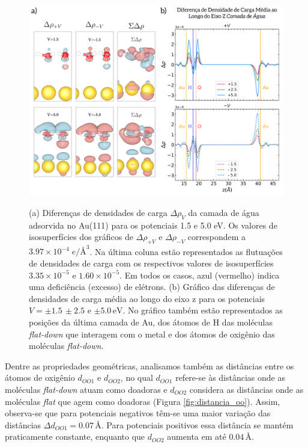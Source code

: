 \begin{figure}[t!]
	\centering
	\caption{(a) Diferenças de densidades de carga $ \Delta \rho_{V} $ da camada de água adsorvida no Au(111) para os potenciais 1.5 e 5.0 eV. Os valores de isosuperfícies dos gráficos de $ \Delta\rho_{+V} $ e $ \Delta\rho_{-V} $ correspondem a $ 3.97\times10^{-4}\;\si{e}/\si{\angstrom}^3 $. Na última coluna estão representados as flutuações de densidades de carga com os respectivos valores de isosuperfícies $ 3.35\times10^{-5}$ e $ 1.60\times10^{-5}$. Em todos os casos, azul (vermelho) indica uma deficiência (excesso) de elétrons. (b) Gráfico das diferenças de densidades de carga média ao longo do eixo z para os potenciais $ V=\pm1.5\,\pm2.5$ e $ \pm5.0\,\si{\eV} $. No gráfico também estão representados as posições da última camada de Au, dos átomos de H das moléculas \textit{flat-down} que interagem com o metal e dos átomos de oxigênio das moléculas \textit{flat-down}.}
	\includegraphics[scale=0.075]{figs/au_densidade_layer.png}
	\label{fig:neq_au_dens}
\end{figure}

Dentre as propriedades geométricas, analisamos também as distâncias entre os átomos de oxigênio $ d_{OO1} $ e $ d_{OO2} $, no qual $ d_{OO1} $ refere-se às distâncias onde as moléculas \textit{flat-down} atuam como doadoras e $ d_{OO2} $ considera as distâncias onde as moléculas \textit{flat} que agem como doadoras (Figura \ref{fig:distancia_oo}). Assim, observa-se que para potenciais negativos têm-se uma maior variação das distâncias $ \Delta d_{OO1}=0.07\,\si{\angstrom} $. Para potenciais positivos essa distância se mantém praticamente constante, enquanto que $ d_{OO2} $ aumenta em até $ 0.04\,\si{\angstrom} $.


